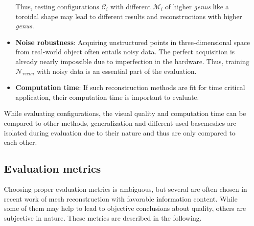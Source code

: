 \begin{itemize}
        Thus, testing configurations $\mathcal{C}_i$ with different $\mathcal{M}_i$ of higher \emph{genus} like a toroidal shape may lead to different results and 
        reconstructions with higher \emph{genus}.
        \item \textbf{Noise robustness}: Acquiring unstructured points in three-dimensional space from real-world object often entails noisy data.
         The perfect acquisition is already nearly impossible due to imperfection in the hardware. Thus, training $\mathcal{N}_{recon}$ with noisy data 
         is an essential part of the evaluation.
        \item \textbf{Computation time}: If such reconstruction methods are fit for time critical application, their computation time is important to evaluate.
    \end{itemize}

    While evaluating configurations, the visual quality and computation time can be compared to other methods, generalization and different used basemeshes
    are isolated during evaluation due to their nature and thus are only compared to each other.

\subsection{Evaluation metrics}

    Choosing proper evaluation metrics is ambiguous, but several are often chosen in recent work of mesh reconstruction with favorable information content. 
    While some of them may help to lead to objective conclusions about quality, others are subjective in nature. These metrics 
    are described in the following. 


